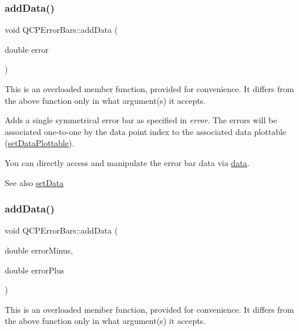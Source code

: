 \subsubsection{\texorpdfstring{add\+Data()}{addData()}\hspace{0.1cm}{\footnotesize\ttfamily [3/4]}}
{\footnotesize\ttfamily void Q\+C\+P\+Error\+Bars\+::add\+Data (\begin{DoxyParamCaption}\item[{double}]{error }\end{DoxyParamCaption})}

This is an overloaded member function, provided for convenience. It differs from the above function only in what argument(s) it accepts.

Adds a single symmetrical error bar as specified in {\itshape error}. The errors will be associated one-\/to-\/one by the data point index to the associated data plottable (\hyperlink{class_q_c_p_error_bars_aabb42a964cfbf780cd1c79850c7cd989}{set\+Data\+Plottable}).

You can directly access and manipulate the error bar data via \hyperlink{class_q_c_p_error_bars_aeebd1b14f4c3573565efafd514988813}{data}.

\begin{DoxySeeAlso}{See also}
\hyperlink{class_q_c_p_error_bars_a92b1980003255f5f7c05407a4d92aabc}{set\+Data} 
\end{DoxySeeAlso}
\mbox{\label{class_q_c_p_error_bars_a1833c5de9c2fe2952b977505d9f27cd1}} 
\subsubsection{\texorpdfstring{add\+Data()}{addData()}\hspace{0.1cm}{\footnotesize\ttfamily [4/4]}}
{\footnotesize\ttfamily void Q\+C\+P\+Error\+Bars\+::add\+Data (\begin{DoxyParamCaption}\item[{double}]{error\+Minus,  }\item[{double}]{error\+Plus }\end{DoxyParamCaption})}

This is an overloaded member function, provided for convenience. It differs from the above function only in what argument(s) it accepts.

